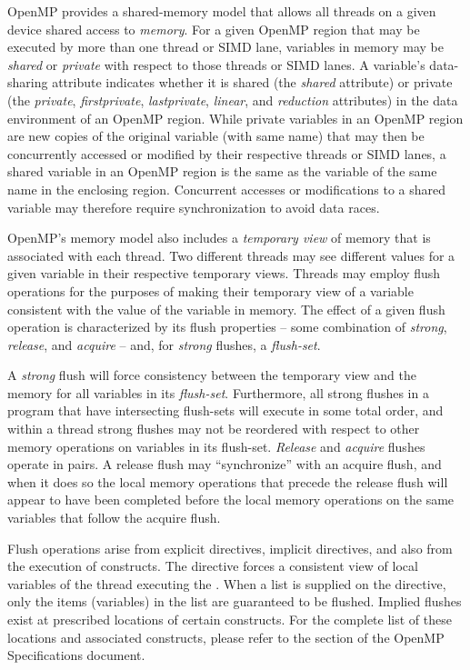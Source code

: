 \label{chap:memory_model}

OpenMP provides a shared-memory model that allows all threads on a given
device shared access to \emph{memory}. For a given OpenMP region that may be
executed by more than one thread or SIMD lane, variables in memory may be
\emph{shared} or \emph{private} with respect to those threads or SIMD lanes. A
variable's data-sharing attribute indicates whether it is shared (the
\emph{shared} attribute) or private (the \emph{private}, \emph{firstprivate},
\emph{lastprivate}, \emph{linear}, and \emph{reduction} attributes) in the data
environment of an OpenMP region. While private variables in an OpenMP region
are new copies of the original variable (with same name) that may then be
concurrently accessed or modified by their respective threads or SIMD lanes, a
shared variable in an OpenMP region is the same as the variable of the same
name in the enclosing region. Concurrent accesses or modifications to a
shared variable may therefore require synchronization to avoid data races.

OpenMP's memory model also includes a \emph{temporary view} of memory that is
associated with each thread. Two different threads may see different values for
a given variable in their respective temporary views. Threads may employ flush
operations for the purposes of making their temporary view of a variable
consistent with the value of the variable in memory. The effect of a given
flush operation is characterized by its flush properties -- some combination of
\emph{strong}, \emph{release}, and \emph{acquire} -- and, for \emph{strong}
flushes, a \emph{flush-set}. 

A \emph{strong} flush will force consistency between the temporary view and the
memory for all variables in its \emph{flush-set}.  Furthermore, all strong flushes in a
program that have intersecting flush-sets will execute in some total order, and
within a thread strong flushes may not be reordered with respect to other
memory operations on variables in its flush-set. \emph{Release} and
\emph{acquire} flushes operate in pairs. A release flush may ``synchronize''
with an acquire flush, and when it does so the local memory operations that
precede the release flush will appear to have been completed before the local
memory operations on the same variables that follow the acquire flush.

Flush operations arise from explicit  directives, implicit
 directives, and also from the execution of 
constructs. The  directive forces a  consistent view of local
variables of the thread executing the .  When a list is supplied on
the directive, only the items (variables) in the list are guaranteed to be
flushed.  Implied flushes exist at prescribed locations of certain constructs.
For the complete list of these locations and associated constructs, please
refer to the  section of the OpenMP Specifications
document.

